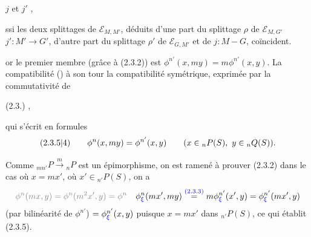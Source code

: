 
  $j$ et $j'$  ,


ssi les deux splittages de $\mathcal E_{M,M'}$, déduits d'une part du splittage $\rho$ de $\mathcal E_{M,G'}$  $j':M'\longrightarrow G'$, d'autre part du splittage $\rho'$ de $\mathcal E_{G,M'}$ et de $j:M\mathbin{-}G$, coïncident.



or le premier membre (grâce à (2.3.2)) est $\phi^{n'}(x,my)=m\phi^{n'}(x,y)$. La compatibilité  ()  à son tour  la compatibilité symétrique, exprimée par la commutativité de

(2.3.)
,

qui s'écrit en formules
\[
(2.3.\unsure{5|4})\qquad \phi^n(x,my)=\phi^{n'}(x,y)\qquad (x\in{}_nP(S),\ y\in{}_nQ(S)).
\]

Comme ${}_{mn'}P\xrightarrow{m}{}_nP$ est un épimorphisme, on est ramené à prouver (2.3.2) dans le cas où $x=mx'$, où $x'\in{}_{n'}P(S)$,  on a
\[
\deleted{\unsure{\phi^n(mx,y)=\phi^n(m^2x',y)=\phi^n}}
\quad
\phi^n_{\inserted{\xi}}(mx',my)\overset{\inserted{(2.3.3)}}{=}m\phi^{n'}_{\inserted{\xi}}(x',y)=\phi^{n'}_{\inserted{\xi}}(mx',y)
\]
(par bilinéarité de $\phi^{n'}$) $=\phi^{n'}_{{\color{blue}\xi}}(x,y)$ puisque $x=mx'$ dans ${}_{n'}P(S)$, ce qui établit (2.3.5).

